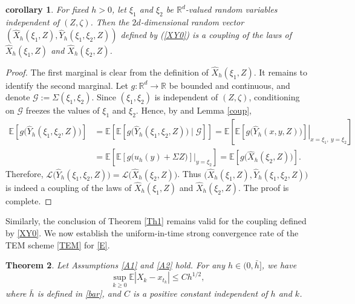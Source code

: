 \documentclass[aap]{imsart}
\theoremstyle{plain}
\newtheorem{theorem}{Theorem}[section]
\newtheorem{corollary}[theorem]{corollary}
\theoremstyle{definition}
\begin{document}
			\begin{corollary}\label{rvcoup}
				For fixed \(h>0\), let \(\xi_1\) and \(\xi_2\) be \(\mathbb R^d\)-valued
				random variables independent of \((Z,\zeta)\). Then the $2d$-dimensional random vector $(\hat{X}_h(\xi_1,Z), \hat{Y}_h(\xi_1, \xi_2,Z))$ defined by (\ref{XY0}) is a coupling of the laws of
				\(\hat X_h(\xi_1,Z)\) and \(\hat X_h(\xi_2,Z)\).	
			\end{corollary}
			\begin{proof}
				The first marginal is clear from the definition of \(\hat X_h(\xi_1,Z)\). It remains to identify the second marginal. Let \(g:\mathbb R^d\to\mathbb R\)
				be bounded and continuous, and denote \(\mathcal G:=\Sigma(\xi_1,\xi_2)\).
				Since \((\xi_1,\xi_2)\) is independent of \((Z,\zeta)\), conditioning on
				\(\mathcal G\) freezes the values of \(\xi_1\) and \(\xi_2\). Hence, by \cite[Theorem 2.24]{FC} and Lemma \ref{coup}, 
				\[
				\begin{aligned}
					\mathbb E\left[
					g\bigl(\hat Y_h(\xi_1,\xi_2,Z)\bigr)
					\right]
					&=
					\mathbb E\left[
					\mathbb E\left[
					g\bigl(\hat Y_h(\xi_1,\xi_2,Z)\bigr)
					\mid \mathcal G
					\right]
					\right]=
					\mathbb E\left[
					\left.
					\mathbb E\left[
					g\bigl(\hat Y_h(x,y,Z)\bigr)
					\right]
					\right|_{x=\xi_1,\ y=\xi_2}
					\right] \\
					&=
					\mathbb E\left[
					\left.
					\mathbb E\left[
					g\bigl(u_h(y)+\Sigma Z\bigr)
					\right]
					\right|_{y=\xi_2}
					\right]=
					\mathbb E\left[
					g\bigl(\hat X_h(\xi_2,Z)\bigr)
					\right].
				\end{aligned}
				\]
				Therefore, \(\mathcal L\bigl(\hat Y_h(\xi_1,\xi_2,Z)\bigr)
				=\mathcal L\bigl(\hat X_h(\xi_2,Z)\bigr)\).
				Thus \(\bigl(\hat X_h(\xi_1,Z),\hat Y_h(\xi_1,\xi_2,Z)\bigr)\)
				is indeed a coupling of the laws of
				\(\hat X_h(\xi_1,Z)\) and \(\hat X_h(\xi_2,Z)\). The proof is complete.
			\end{proof}
			Similarly, the conclusion of Theorem \ref{Th1} remains valid for the
			coupling defined by \eqref{XY0}. We now establish the uniform-in-time
			strong convergence rate of the TEM scheme \eqref{TEM} for \eqref{E}.
			
			\begin{theorem}\label{Th2}
				Let Assumptions \ref{A1} and \ref{A2} hold. For any
				\(h\in(0,\bar h]\), we have \[\sup_{k\geqslant 0}
				\mathbb E\left|X_k-x_{t_k}\right|
				\leqslant
				C h^{1/2},\]
				where \(\bar h\) is defined in \eqref{bar}, and \(C\) is a positive
				constant independent of \(h\) and \(k\).
			\end{theorem}
			
\end{document}

